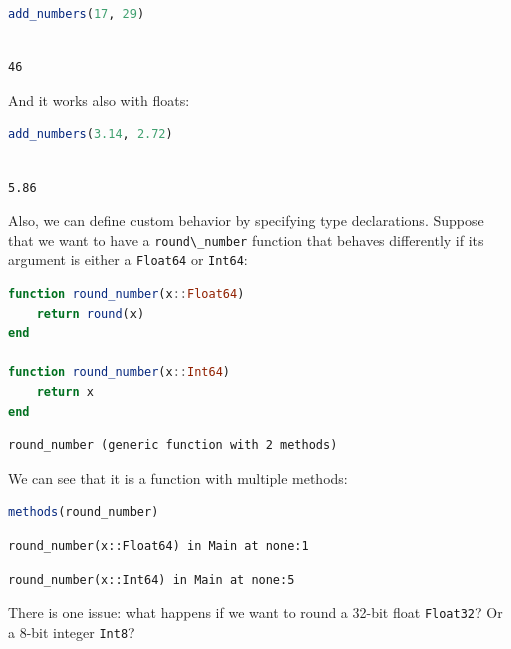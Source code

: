 \documentclass[
  notoc %
]{tufte-book}
\newcommand{\passthrough}[1]{#1}
\begin{document}
\begin{lstlisting}[language=Julia]
add_numbers(17, 29)
\end{lstlisting}

\begin{lstlisting}[language=Output]

46

\end{lstlisting}

And it works also with floats:

\begin{lstlisting}[language=Julia]
add_numbers(3.14, 2.72)
\end{lstlisting}

\begin{lstlisting}[language=Output]

5.86

\end{lstlisting}

Also, we can define custom behavior by specifying type declarations.
Suppose that we want to have a \passthrough{\lstinline!round\_number!}
function that behaves differently if its argument is either a
\passthrough{\lstinline!Float64!} or \passthrough{\lstinline!Int64!}:

\begin{lstlisting}[language=Julia]
function round_number(x::Float64)
    return round(x)
end

function round_number(x::Int64)
    return x
end
\end{lstlisting}

\begin{lstlisting}[language=Output]
round_number (generic function with 2 methods)
\end{lstlisting}

We can see that it is a function with multiple methods:

\begin{lstlisting}[language=Julia]
methods(round_number)
\end{lstlisting}

\begin{lstlisting}[language=Output]
round_number(x::Float64) in Main at none:1
\end{lstlisting}

\begin{lstlisting}[language=Output]
round_number(x::Int64) in Main at none:5
\end{lstlisting}

There is one issue: what happens if we want to round a 32-bit float
\passthrough{\lstinline!Float32!}? Or a 8-bit integer
\passthrough{\lstinline!Int8!}?
\end{document}
